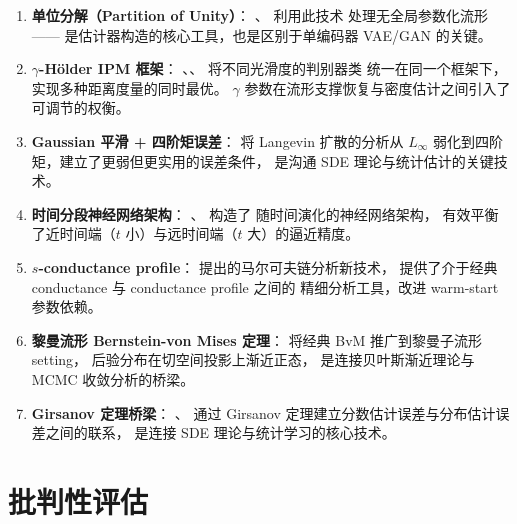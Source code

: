 \begin{enumerate}
    \item \textbf{单位分解（Partition of Unity）}：
          \citep{tang2022minimax}、\citep{tang2023lowdim} 利用此技术
          处理无全局参数化流形——
          是估计器构造的核心工具，也是区别于单编码器 VAE/GAN 的关键。

    \item \textbf{$\gamma$-Hölder IPM 框架}：
          \citep{tang2022minimax}、\citep{tang2023twosample}、
          \citep{tang2025regression} 将不同光滑度的判别器类
          统一在同一个框架下，实现多种距离度量的同时最优。
          $\gamma$ 参数在流形支撑恢复与密度估计之间引入了可调节的权衡。

    \item \textbf{Gaussian 平滑 + 四阶矩误差}：
          \citep{tang2024diffusion} 将 Langevin 扩散的分析从 $L_\infty$
          弱化到四阶矩，建立了更弱但更实用的误差条件，
          是沟通 SDE 理论与统计估计的关键技术。

    \item \textbf{时间分段神经网络架构}：
          \citep{tang2024diffusion}、\citep{tang2025conditional} 构造了
          随时间演化的神经网络架构，
          有效平衡了近时间端（$t$ 小）与远时间端（$t$ 大）的逼近精度。

    \item \textbf{$s$-conductance profile}：
          \citep{tang2024mala} 提出的马尔可夫链分析新技术，
          提供了介于经典 conductance 与 conductance profile 之间的
          精细分析工具，改进 warm-start 参数依赖。

    \item \textbf{黎曼流形 Bernstein-von Mises 定理}：
          \citep{tang2023robust} 将经典 BvM 推广到黎曼子流形 setting，
          后验分布在切空间投影上渐近正态，
          是连接贝叶斯渐近理论与 MCMC 收敛分析的桥梁。

    \item \textbf{Girsanov 定理桥梁}：
          \citep{tang2024diffusion}、\citep{tang2025conditional} 通过
          Girsanov 定理建立分数估计误差与分布估计误差之间的联系，
          是连接 SDE 理论与统计学习的核心技术。
\end{enumerate}

\section{批判性评估}\label{sec:evaluation}

